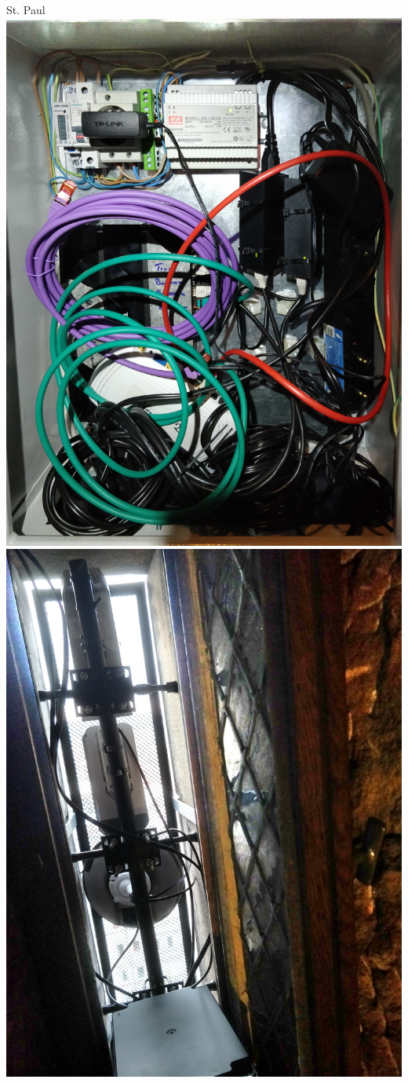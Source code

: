 \begin{frame}{St. Paul}
{        \includegraphics[height=0.86\textheight]{img/stpaul-kasten}
        \hfill
        \includegraphics[height=0.86\textheight]{img/stpaul-fenster}
        \hfill
        ~
    }
\end{frame}
